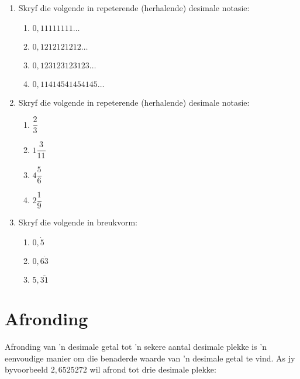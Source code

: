 \begin{exercises}{}
{\begin{enumerate}[itemsep=5pt, label=\textbf{\arabic*}. ]
\item Skryf die volgende in repeterende (herhalende) desimale notasie:
    \begin{enumerate}[itemsep=5pt, label=\textbf{\alph*}. ] 
    \item $0,11111111\ldots$
    \item $0,1212121212\ldots$
    \item $0,123123123123\ldots$
    \item $0,11414541454145\ldots$
    \end{enumerate}
\item Skryf die volgende in repeterende (herhalende) desimale notasie:
    \begin{enumerate}[itemsep=5pt, label=\textbf{\alph*}. ] 
    \item $\dfrac{2}{3}$
    \item $1\dfrac{3}{11}$
    \item $4\dfrac{5}{6}$
    \item $2\dfrac{1}{9}$
    \end{enumerate}
\item Skryf die volgende in breukvorm:
    \begin{enumerate}[itemsep=5pt, label=\textbf{\alph*}. ] 
    \item $0,\dot{5}$
    \item $0,6\dot{3}$
    \item $5,\overline{31}$
    \end{enumerate}
\end{enumerate}

}
\end{exercises}

\section{Afronding}
\nopagebreak

Afronding van ’n desimale getal tot ’n sekere aantal desimale plekke is ’n eenvoudige manier om die benaderde waarde van ’n desimale getal te vind. As jy byvoorbeeld $2,6525272$ wil afrond tot drie desimale plekke:

